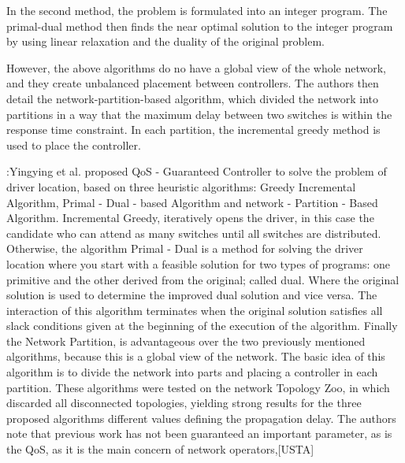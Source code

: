 \documentclass[a4paper,10pt]{article}
\begin{document}
In the second method, the problem is formulated into an integer program. The primal-dual method then finds the near optimal solution to the integer program by using linear relaxation and the duality of the original problem. 

However, the above algorithms do no have a global view of the whole network, and they create unbalanced placement between controllers. The authors then detail the network-partition-based algorithm, which divided the network into partitions in a way that the maximum delay between two switches is within the response time constraint. In each partition, the incremental greedy method is used to place the controller.

\cite{ChWa15}:Yingying et al. proposed QoS - Guaranteed Controller to solve the problem of driver location, based on three heuristic algorithms: Greedy Incremental Algorithm, Primal - Dual - based Algorithm and network - Partition - Based Algorithm. Incremental Greedy, iteratively opens the driver, in this case the candidate who can attend as many switches until all switches are distributed. Otherwise, the algorithm Primal - Dual is a method for solving the driver location where you start with a feasible solution for two types of programs: one primitive and the other derived from the original; called dual. Where the original solution is used to determine the improved dual solution and vice versa. The interaction of this algorithm terminates when the original solution satisfies all slack conditions given at the beginning of the execution of the algorithm. Finally the Network Partition, is advantageous over the two previously mentioned algorithms, because this is a global view of the network. The basic idea of this algorithm is to divide the network into parts and placing a controller in each partition. These algorithms were tested on the network Topology Zoo, in which discarded all disconnected topologies, yielding strong results for the three proposed algorithms different values defining the propagation delay. The authors note that previous work has not been guaranteed an important parameter, as is the QoS, as it is the main concern of network operators,[USTA]
\end{document}
